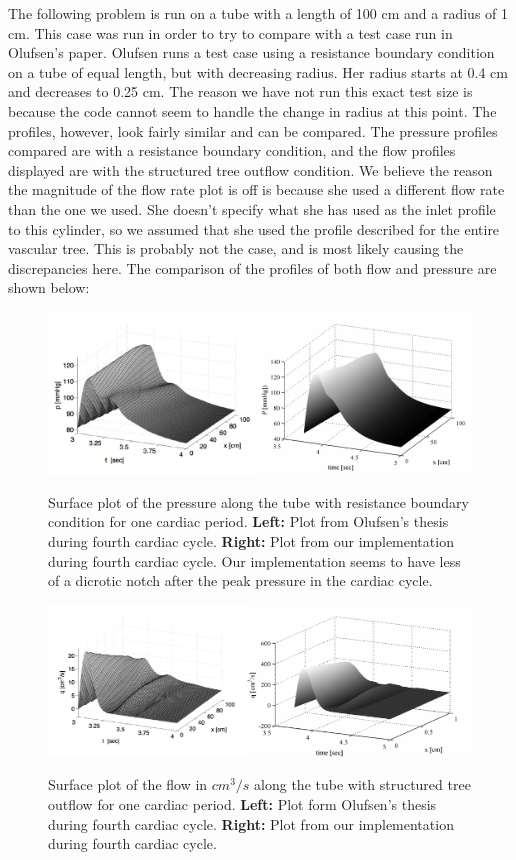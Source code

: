 \documentclass[12pt]{article}
\begin{document}
 The following problem is run on a tube with a length of 100 cm and a radius of 1 cm. This case was run in order to try to compare with a test case run in Olufsen's paper. Olufsen runs a test case using a resistance boundary condition on a tube of equal length, but with decreasing radius. Her radius starts at 0.4 cm and decreases to 0.25 cm. The reason we have not run this exact test size is because the code cannot seem to handle the change in radius at this point. The profiles, however, look fairly similar and can be compared. The pressure profiles compared are with a resistance boundary condition, and the flow profiles displayed are with the structured tree outflow condition. We believe the reason the magnitude of the flow rate plot is off is because she used a different flow rate than the one we used. She doesn't specify what she has used as the inlet profile to this cylinder, so we assumed that she used the profile described for the entire vascular tree. This is probably not the case, and is most likely causing the discrepancies here. The comparison of the profiles of both flow and pressure are shown below:

\begin{figure}[ht]
	\centering
	\includegraphics[width=6in]{pplot}
	\label{ours}
	\caption{Surface plot of the pressure along the tube with resistance boundary condition for one cardiac period. \textbf{Left:} Plot from Olufsen's thesis during fourth cardiac cycle. \textbf{Right:} Plot from our implementation during fourth cardiac cycle. Our implementation seems to have less of a dicrotic notch after the peak pressure in the cardiac cycle.}
\end{figure}

\begin{figure}[ht]
	\centering
	\includegraphics[width=6in]{qplot}
	\label{ours}
	\caption{Surface plot of the flow in $cm^3/s$ along the tube with structured tree outflow for one cardiac period. \textbf{Left:} Plot form Olufsen's thesis during fourth cardiac cycle. \textbf{Right: } Plot from our implementation during fourth cardiac cycle.}
\end{figure}
\end{document}
